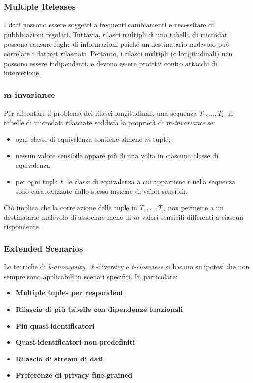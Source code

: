\documentclass{report}
\begin{document}
\subsubsection{Multiple Releases}
I dati possono essere soggetti a frequenti cambiamenti e necessitare di pubblicazioni regolari. 
Tuttavia, rilasci multipli di una tabella di microdati possono causare fughe di informazioni poiché un destinatario malevolo può correlare i dataset rilasciati.
 Pertanto, i rilasci multipli (o longitudinali) non possono essere indipendenti, e devono essere protetti contro attacchi di intersezione.

\subsubsection{m-invariance}
Per affrontare il problema dei rilasci longitudinali, una sequenza $T_1, ..., T_n$ di tabelle di microdati rilasciate soddisfa la proprietà di \textit{m-invariance} se:

\begin{itemize}
    \item ogni classe di equivalenza contiene almeno $m$ tuple;
    \item nessun valore sensibile appare più di una volta in ciascuna classe di equivalenza;
    \item per ogni tupla $t$, le classi di equivalenza a cui appartiene $t$ nella sequenza sono caratterizzate dallo stesso insieme di valori sensibili.
\end{itemize}

\noindent Ciò implica che la correlazione delle tuple in $T_1, ..., T_n$ non permette a un destinatario malevolo di associare meno di $m$ valori sensibili differenti a ciascun rispondente.

\subsubsection{Extended Scenarios}
Le tecniche di \textit{k-anonymity}, $\ell$-diversity e \textit{t-closeness} si basano su ipotesi che non sempre sono applicabili in scenari specifici. In particolare:

\begin{itemize}
    \item \textbf{Multiple tuples per respondent}
    \item \textbf{Rilascio di più tabelle con dipendenze funzionali}
    \item \textbf{Più quasi-identificatori}
    \item \textbf{Quasi-identificatori non predefiniti}
    \item \textbf{Rilascio di stream di dati}
    \item \textbf{Preferenze di privacy fine-grained}
\end{itemize}
\end{document}
